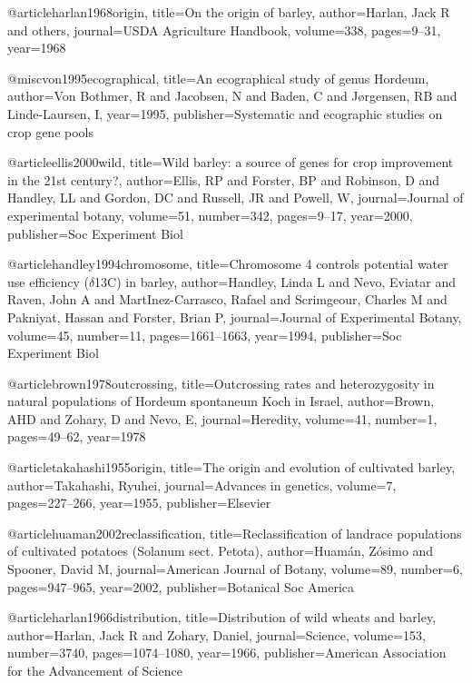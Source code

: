 {@article{harlan1968origin,
  title={On the origin of barley},
  author={Harlan, Jack R and others},
  journal={USDA Agriculture Handbook},
  volume={338},
  pages={9--31},
  year={1968}
}

@misc{von1995ecographical,
  title={An ecographical study of genus Hordeum},
  author={Von Bothmer, R and Jacobsen, N and Baden, C and J{\o}rgensen, RB and Linde-Laursen, I},
  year={1995},
  publisher={Systematic and ecographic studies on crop gene pools}
}

@article{ellis2000wild,
  title={Wild barley: a source of genes for crop improvement in the 21st century?},
  author={Ellis, RP and Forster, BP and Robinson, D and Handley, LL and Gordon, DC and Russell, JR and Powell, W},
  journal={Journal of experimental botany},
  volume={51},
  number={342},
  pages={9--17},
  year={2000},
  publisher={Soc Experiment Biol}
}

@article{handley1994chromosome,
  title={Chromosome 4 controls potential water use efficiency ($\delta$13C) in barley},
  author={Handley, Linda L and Nevo, Eviatar and Raven, John A and MartInez-Carrasco, Rafael and Scrimgeour, Charles M and Pakniyat, Hassan and Forster, Brian P},
  journal={Journal of Experimental Botany},
  volume={45},
  number={11},
  pages={1661--1663},
  year={1994},
  publisher={Soc Experiment Biol}
}

@article{brown1978outcrossing,
  title={Outcrossing rates and heterozygosity in natural populations of Hordeum spontaneum Koch in Israel},
  author={Brown, AHD and Zohary, D and Nevo, E},
  journal={Heredity},
  volume={41},
  number={1},
  pages={49--62},
  year={1978}
}

@article{takahashi1955origin,
  title={The origin and evolution of cultivated barley},
  author={Takahashi, Ryuhei},
  journal={Advances in genetics},
  volume={7},
  pages={227--266},
  year={1955},
  publisher={Elsevier}
}

@article{huaman2002reclassification,
  title={Reclassification of landrace populations of cultivated potatoes (Solanum sect. Petota)},
  author={Huam{\'a}n, Z{\'o}simo and Spooner, David M},
  journal={American Journal of Botany},
  volume={89},
  number={6},
  pages={947--965},
  year={2002},
  publisher={Botanical Soc America}
}

@article{harlan1966distribution,
  title={Distribution of wild wheats and barley},
  author={Harlan, Jack R and Zohary, Daniel},
  journal={Science},
  volume={153},
  number={3740},
  pages={1074--1080},
  year={1966},
  publisher={American Association for the Advancement of Science}
}

}
